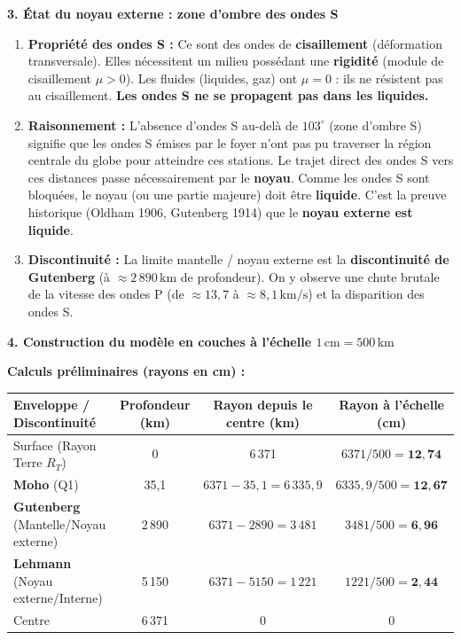 \documentclass[11pt]{article}
\begin{document}
\begin{exoresolu}
\textbf{3. État du noyau externe : zone d'ombre des ondes S}
\begin{enumerate}
    \item \textbf{Propriété des ondes S :} Ce sont des ondes de \textbf{cisaillement} (déformation transversale). Elles nécessitent un milieu possédant une \textbf{rigidité} (module de cisaillement $\mu > 0$). Les fluides (liquides, gaz) ont $\mu = 0$ : ils ne résistent pas au cisaillement. \textbf{Les ondes S ne se propagent pas dans les liquides.}
    \item \textbf{Raisonnement :} L'absence d'ondes S au-delà de $103^\circ$ (zone d'ombre S) signifie que les ondes S émises par le foyer n'ont pas pu traverser la région centrale du globe pour atteindre ces stations. Le trajet direct des ondes S vers ces distances passe nécessairement par le \textbf{noyau}. Comme les ondes S sont bloquées, le noyau (ou une partie majeure) doit être \textbf{liquide}. C'est la preuve historique (Oldham 1906, Gutenberg 1914) que le \textbf{noyau externe est liquide}.
    \item \textbf{Discontinuité :} La limite mantelle / noyau externe est la \textbf{discontinuité de Gutenberg} (à $\approx 2\,890\,\text{km}$ de profondeur). On y observe une chute brutale de la vitesse des ondes P (de $\approx 13,7$ à $\approx 8,1\,\text{km/s}$) et la disparition des ondes S.
\end{enumerate}

\textbf{4. Construction du modèle en couches à l'échelle $1\,\text{cm} = 500\,\text{km}$}
\par
\textbf{Calculs préliminaires (rayons en cm) :}
\begin{center}
\begin{tabular}{|l|c|c|c|}\hline
\textbf{Enveloppe / Discontinuité} & \textbf{Profondeur (km)} & \textbf{Rayon depuis le centre (km)} & \textbf{Rayon à l'échelle (cm)} \\ \hline
Surface (Rayon Terre $R_T$) & 0 & 6\,371 & $6371 / 500 = \mathbf{12,74}$ \\ \hline
\textbf{Moho} (Q1) & 35,1 & $6371 - 35,1 = 6\,335,9$ & $6335,9 / 500 = \mathbf{12,67}$ \\ \hline
\textbf{Gutenberg} (Mantelle/Noyau externe) & 2\,890 & $6371 - 2890 = 3\,481$ & $3481 / 500 = \mathbf{6,96}$ \\ \hline
\textbf{Lehmann} (Noyau externe/Interne) & 5\,150 & $6371 - 5150 = 1\,221$ & $1221 / 500 = \mathbf{2,44}$ \\ \hline
Centre & 6\,371 & 0 & 0 \\ \hline
\end{tabular}
\end{center}


\end{exoresolu}
\end{document}
